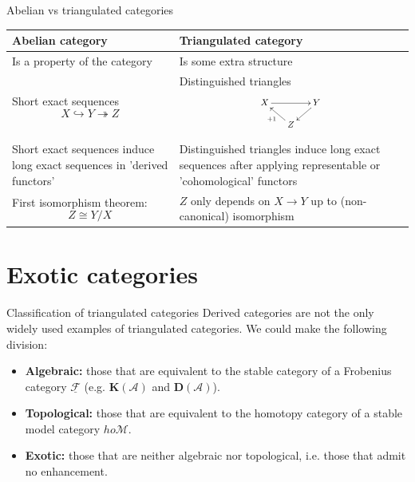 \documentclass{beamer}
\begin{document}
\begin{frame}{Abelian vs triangulated categories}
  \scriptsize
  \centering
  \renewcommand{\arraystretch}{1.25}
  \begin{tabular}{|p{}|p{}|}
    \hline
    \textbf{Abelian category} & \textbf{Triangulated category} \\
    \hline
    Is a property of the category & Is some extra structure \\
    \hline
    Short exact sequences
    $$ X \hookrightarrow Y \twoheadrightarrow Z $$ & Distinguished triangles
    $$\scalebox{0.8}{$\xymatrix@C=1.5em@R=1.2em{X \ar[rr] & & Y \ar[ld] \\ & Z \ar[lu]^{+1} & }$}$$ \\
    \hline
    Short exact sequences induce long exact sequences in 'derived functors' & Distinguished triangles induce long exact sequences after applying representable or 'cohomological' functors \\
    \hline
    First isomorphism theorem: 
    $$ Z \cong Y/X $$ & $Z$ only depends on $X\to Y$ up to (non-canonical) isomorphism \\
    \hline
  \end{tabular}
\end{frame}



\section{Exotic categories}

\begin{frame}{Classification of triangulated categories}
    Derived categories are not the only widely used examples of triangulated categories. We could make the following division:
  \begin{itemize}
    \item \textbf{Algebraic:} those that are equivalent to the stable category of a Frobenius category $\underline{\mathscr{F}}$ (e.g. $\mathbf{K}(\mathscr{A})$ and $\mathbf{D}(\mathscr{A})$). \pause
    \item \textbf{Topological:} those that are equivalent to the homotopy category of a stable model category $ho\mathscr{M}$. \pause
    \item \textbf{Exotic:} those that are neither algebraic nor topological, i.e. those that admit no enhancement.
  \end{itemize}
\end{frame}
\end{document}
